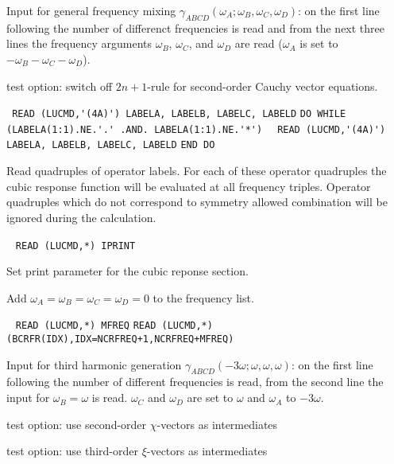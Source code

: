 \begin{description}
Input for general frequency mixing
$\gamma_{ABCD}(\omega_A;\omega_B,\omega_C,\omega_D)$: on the first line
following  the number of differenct frequencies
is read and from the next three lines the frequency arguments 
$\omega_B$, $\omega_C$, and $\omega_D$ are read
($\omega_A$ is set to $-\omega_B-\omega_C-\omega_D$).
                                                           
\item[\Key{NO2NP1}] test option: switch off $2n+1$-rule for second-order
                    Cauchy vector equations.
 
\item[\Key{OPERAT}] \verb| |\newline
\verb|READ (LUCMD,'(4A)') LABELA, LABELB, LABELC, LABELD|\newline
\verb|DO WHILE (LABELA(1:1).NE.'.' .AND. LABELA(1:1).NE.'*')|\newline
\verb|  READ (LUCMD,'(4A)') LABELA, LABELB, LABELC, LABELD|\newline
\verb|END DO|

Read quadruples of operator labels.
For each of these operator quadruples the cubic response
function will be evaluated at all frequency triples.
Operator quadruples which do not correspond to symmetry allowed
combination will be ignored during the calculation. 

\item[\Key{PRINT}] \verb| |\newline
\verb|READ (LUCMD,*) IPRINT|

Set print parameter for the cubic reponse section.

\item[\Key{STATIC}] 
Add $\omega_A = \omega_B = \omega_C = \omega_D = 0$ to the frequency list.

\item[\Key{THGFRE}] \verb| |\newline
\verb|READ (LUCMD,*) MFREQ|\newline
\verb|READ (LUCMD,*) (BCRFR(IDX),IDX=NCRFREQ+1,NCRFREQ+MFREQ)|

Input for third harmonic generation
$\gamma_{ABCD}(-3\omega;\omega,\omega,\omega)$:
on the first line following  the number of different
frequencies is read, from the second line the input for
$\omega_B = \omega$ is read. $\omega_C$ and $\omega_D$ are set to 
$\omega$ and $\omega_A$ to $-3\omega$. 
 
\item[\Key{USECHI}]
test option: use second-order $\chi$-vectors as intermediates
 
\item[\Key{USEXKS}] 
test option: use third-order $\xi$-vectors as intermediates
 
%

\end{description}
